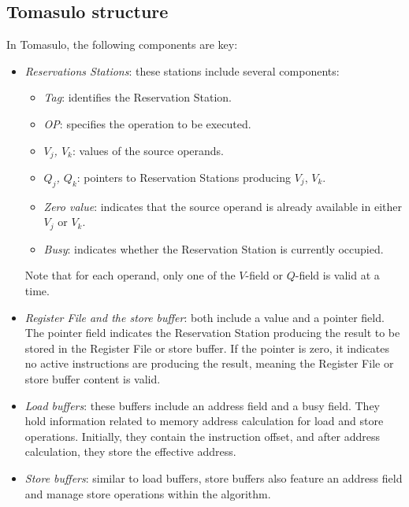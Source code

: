 \subsection{Tomasulo structure}
In Tomasulo, the following components are key:
\begin{itemize}
    \item \textit{Reservations Stations}: these stations include several components:
        \begin{itemize}
            \item \textit{Tag}: identifies the Reservation Station.
            \item \textit{OP}: specifies the operation to be executed.
            \item \textit{$V_j$, $V_k$}: values of the source operands.
            \item \textit{$Q_j$, $Q_k$}: pointers to Reservation Stations producing $V_j$, $V_k$.
            \item \textit{Zero value}: indicates that the source operand is already available in either $V_j$ or $V_k$.
            \item \textit{Busy}: indicates whether the Reservation Station is currently occupied.
        \end{itemize}
        Note that for each operand, only one of the $V$-field or $Q$-field is valid at a time.
    \item \textit{Register File and the store buffer}: both include a value and a pointer field. 
        The pointer field indicates the Reservation Station producing the result to be stored in the Register File or store buffer. 
        If the pointer is zero, it indicates no active instructions are producing the result, meaning the Register File or store buffer content is valid.
    \item \textit{Load buffers}: these buffers include an address field and a busy field. 
        They hold information related to memory address calculation for load and store operations. 
        Initially, they contain the instruction offset, and after address calculation, they store the effective address.
    \item \textit{Store buffers}: similar to load buffers, store buffers also feature an address field and manage store operations within the algorithm.
\end{itemize}

